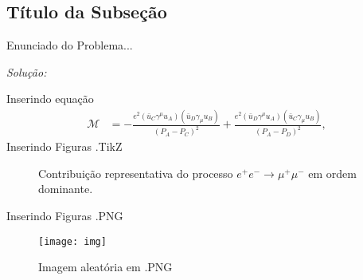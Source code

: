 \subsection{Título da Subseção}
\begin{problem}
  Enunciado do Problema...
\end{problem}
\textcolor{deepGreen}{\textit{Solução:}}

Inserindo equação
\begin{align}
  \mathcal{M} &= -\frac{e^{2}\left(\bar{u}_{C} \gamma^{\mu}u_{A}\right)\left(\bar{u}_{D} \gamma_{\mu}u_{B}\right)}{\left(P_{A}-P_{C}\right)^{2}} + \frac{e^{2}\left(\bar{u}_{D} \gamma^{\mu}u_{A}\right)\left(\bar{u}_{C} \gamma_{\mu}u_{B}\right)}{\left(P_{A}-P_{D}\right)^{2}},
\end{align}
\newpage
Inserindo Figuras .TikZ
\begin{figure}[htb!]
  \centering
  \begin{tikzpicture}
    
  \end{tikzpicture}
  \caption{Contribuição representativa do processo $e^{+}e^{-}\to \mu^{+} \mu^{-}$ em ordem dominante.}
  \label{fig:aniq-eletron-muon}
\end{figure}

Inserindo Figuras .PNG
\begin{figure}[htb!]
  \begin{center}
    \texttt{[image: img]}
  \end{center}
  \caption{Imagem aleatória em .PNG}\label{fig:img}
\end{figure}


